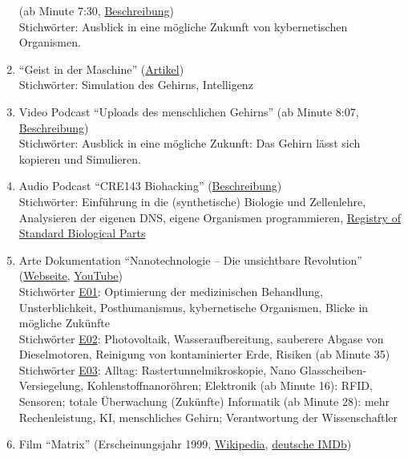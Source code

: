 \begin{enumerate}
		(ab Minute 7:30, \href{http://www.elektrischer-reporter.de/phase3/video/252}%
		{Beschreibung}) \\
		Stichwörter: Ausblick in eine mögliche Zukunft von kybernetischen Organismen.
	\item \enquote{Geist in der Maschine}
		(\href{http://www.heise.de/tr/artikel/Geist-in-der-Maschine-277969.html}{Artikel}) \\
		Stichwörter: Simulation des Gehirns, Intelligenz
	\item Video Podcast \enquote{Uploads des menschlichen Gehirns}
		(ab Minute 8:07, \href{http://www.elektrischer-reporter.de/phase3/video/267/}%
		{Beschreibung}) \\
		Stichwörter: Ausblick in eine mögliche Zukunft: Das Gehirn lässt sich kopieren und
			Simulieren.
	\item Audio Podcast \enquote{CRE143 Biohacking}
		(\href{http://cre.fm/cre143}{Beschreibung}) \\
		Stichwörter: Einführung in die (synthetische) Biologie und Zellenlehre,
			Analysieren der eigenen DNS, eigene Organismen programmieren,
			\href{http://partsregistry.org/Catalog}{Registry of Standard Biological Parts}
	\item Arte Dokumentation \enquote{Nanotechnologie -- Die unsichtbare Revolution}
		(\href{http://www.arte.tv/de/6338036.html}{Webseite},
		\href{https://www.youtube.com/watch?v=UoYLd4jUT5k}{YouTube}) \\
		Stichwörter \href{http://www.youtube.com/watch?v=TFLNWHsw4ro}{E01}:
			Optimierung der medizinischen Behandlung, Unsterblichkeit, Posthumanismus,
			kybernetische Organismen, Blicke in mögliche Zukünfte \\
		Stichwörter \href{http://www.youtube.com/watch?v=O2q6LfjSt_Y}{E02}:
			Photovoltaik, Wasseraufbereitung, sauberere Abgase von Dieselmotoren,
			Reinigung von kontaminierter Erde, Risiken (ab Minute 35) \\
		Stichwörter \href{http://www.youtube.com/watch?v=ATo85_43QdI}{E03}:
			Alltag: Rastertunnelmikroskopie, Nano Glasscheiben-Versiegelung,
			Kohlenstoffnanoröhren;
			Elektronik (ab Minute 16): RFID, Sensoren; totale Überwachung (Zukünfte)
			Informatik (ab Minute 28): mehr Rechenleistung, KI, menschliches Gehirn;
			Verantwortung der Wissenschaftler
	\item Film \enquote{Matrix}
		(Erscheinungsjahr 1999, \href{http://de.wikipedia.org/wiki/Matrix_(Film)}{Wikipedia},
		\href{http://www.imdb.de/title/tt0133093/}{deutsche IMDb}) \\

\end{enumerate}

